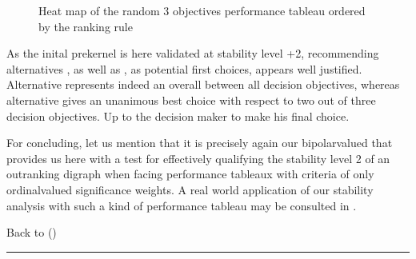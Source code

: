 \documentclass[a4paper,12pt,english]{sphinxhowto}
\let\sphinxpxdimen\pdfpxdimen\else\newdimen\sphinxpxdimen
\begin{document}
\begin{figure}[H]
\centering
\capstart

\noindent\sphinxincludegraphics[width=600\sphinxpxdimen]{{robustHeatmap}.png}
\caption{Heat map of the random 3 objectives performance tableau ordered by the  ranking rule}\label{\detokenize{pearls:robustheatmap}}\end{figure}

\sphinxAtStartPar
As the inital prekernel is here validated at stability level +2, recommending alternatives , as well as , as potential first choices, appears well justified. Alternative  represents indeed an overall  between all decision objectives, whereas alternative  gives an unanimous best choice with respect to two out of three decision objectives. Up to the decision maker to make his final choice.

\sphinxAtStartPar
For concluding, let us mention that it is precisely again our bipolar\sphinxhyphen{}valued  that provides us here with a  test for effectively qualifying the stability level 2  of an outranking digraph when facing performance tableaux with criteria of only ordinal\sphinxhyphen{}valued significance weights. A real world application of our stability analysis with such a kind of performance tableau may be consulted in .

\sphinxAtStartPar
Back to {\hyperref[\detokenize{pearls:pearls-label}]{}} ()


\bigskip\hrule\bigskip
\end{document}
